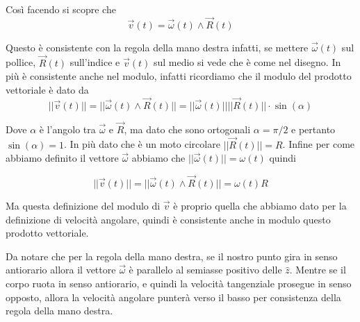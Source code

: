 \documentclass{rapport}
\begin{document}
Così facendo si scopre che 
\[
\vec{v}(t) = \vec{\omega}(t) \wedge \vec{R}(t)
\]

Questo è consistente con la regola della mano destra infatti, se mettere $\vec{\omega}(t)$ sul pollice, $\vec{R}(t)$ sull'indice e $\vec{v}(t)$ sul medio si vede che è come nel disegno. In più è consistente anche nel modulo, infatti ricordiamo che il modulo del prodotto vettoriale è dato da 
\[
||\vec{v}(t) ||= ||\vec{\omega}(t) \wedge \vec{R}(t)|| = ||\vec{\omega}(t)||||\vec{R}(t)||\cdot\sin(\alpha)
\]

Dove $\alpha$ è l'angolo tra $\vec{\omega}$ e $\vec{R}$, ma dato che sono ortogonali $\alpha = \pi/2$ e pertanto $\sin(\alpha) = 1$. In più dato che è un moto circolare $||\vec{R}(t)|| = R$. Infine per come abbiamo definito il vettore $\vec{\omega}$ abbiamo che $||\vec{\omega}(t)|| = \omega(t) $ quindi 

\[
||\vec{v}(t) ||= ||\vec{\omega}(t) \wedge \vec{R}(t)|| = \omega(t)R
\]

Ma questa definizione del modulo di $\vec{v}$ è proprio quella che abbiamo dato per la definizione di velocità angolare, quindi è consistente anche in modulo questo prodotto vettoriale.

Da notare che per la regola della mano destra, se il nostro punto gira in senso antiorario allora il vettore $\vec{\omega}$ è parallelo al semiasse positivo delle $\hat{z}$. Mentre se il corpo ruota in senso antiorario, e quindi la velocità tangenziale prosegue in senso opposto, allora la velocità angolare punterà verso il basso per consistenza della regola della mano destra.
\end{document}
